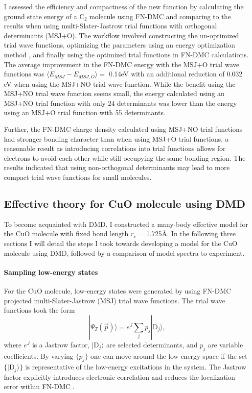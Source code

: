 \documentclass[12pt]{article}
\begin{document}
I assessed the efficiency and compactness of the new function by calculating the ground state energy of a C$_2$ molecule using FN-DMC and comparing to the results when using multi-Slater-Jastrow trial functions with orthogonal determinants (MSJ+O). 
The workflow involved constructing the un-optimized trial wave functions, optimizing the parameters using an energy optimization method \cite{Toulouse2007}, and finally using the optimized trial functions in FN-DMC calculations. 
The average improvement in the FN-DMC energy with the MSJ+O trial wave functions was $\langle E_{MSJ} - E_{MSJ,O}\rangle =$ 0.14eV with an additional reduction of 0.032 eV when using the MSJ+NO trial wave function.
While the benefit using the MSJ+NO trial wave function seems small, the energy calculated using an MSJ+NO trial function with only 24 determinants was lower than the energy using an MSJ+O trial 
function with 55 determinants.

Further, the FN-DMC charge density calculated using MSJ+NO trial functions had stronger bonding character than when using MSJ+O trial functions, a reasonable result as introducing correlations into trial functions allows for electrons to avoid each other while still occupying the same bonding region. 
The results indicated that using non-orthogonal determinants may lead to more compact trial wave functions for small molecules.

\subsection{Effective theory for CuO molecule using DMD}
To become acquainted with DMD, I constructed a many-body effective model for the CuO molecule with fixed bond length $r_e$ = 1.725\r{A}.
In the following three sections I will detail the steps I took towards developing a model for the CuO molecule using DMD, followed by a comparison of model spectra to experiment.

\vspace{-10pt}
\paragraph{Sampling low-energy states}
For the CuO molecule, low-energy states were generated by using FN-DMC projected multi-Slater-Jastrow (MSJ) trial wave functions.
The trial wave functions took the form
\begin{equation}
|\Psi_T(\vec{p}) \rangle =  e^{J}\sum_{j} p_j|\text{D}_j\rangle,
\label{eq:sampling}
\end{equation}
where $e^J$ is a Jastrow factor, $|\text{D}_j\rangle$ are selected determinants, and $p_j$ are variable coefficients.
By varying $\{p_j\}$ one can move around the low-energy space if the set $\{|\text{D}_j \rangle\}$ is representative of the low-energy excitations in the system.
The Jastrow factor explicitly introduces electronic correlation and reduces the localization error within FN-DMC \cite{Foulkes2001}.
\end{document}
